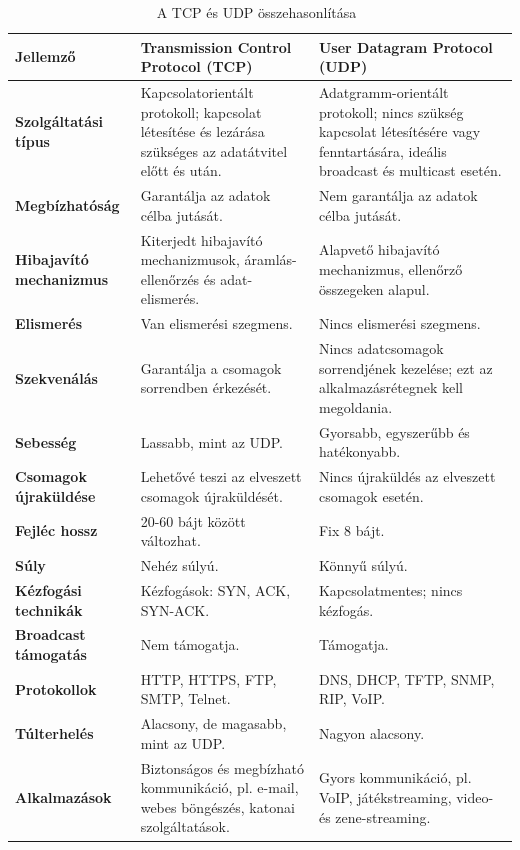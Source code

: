 \begin{table}[h!]
	\centering
	\begin{tabular}{|l|p{5cm}|p{5cm}|}
	\hline
	\textbf{Jellemző} & \textbf{Transmission Control Protocol (TCP)} & \textbf{User Datagram Protocol (UDP)} \\
	\hline
	\textbf{Szolgáltatási típus} & Kapcsolatorientált protokoll; kapcsolat létesítése és lezárása szükséges az adatátvitel előtt és után. & Adatgramm-orientált protokoll; nincs szükség kapcsolat létesítésére vagy fenntartására, ideális broadcast és multicast esetén. \\
	\hline
	\textbf{Megbízhatóság} & Garantálja az adatok célba jutását. & Nem garantálja az adatok célba jutását. \\
	\hline
	\textbf{Hibajavító mechanizmus} & Kiterjedt hibajavító mechanizmusok, áramlás-ellenőrzés és adat-elismerés. & Alapvető hibajavító mechanizmus, ellenőrző összegeken alapul. \\
	\hline
	\textbf{Elismerés} & Van elismerési szegmens. & Nincs elismerési szegmens. \\
	\hline
	\textbf{Szekvenálás} & Garantálja a csomagok sorrendben érkezését. & Nincs adatcsomagok sorrendjének kezelése; ezt az alkalmazásrétegnek kell megoldania. \\
	\hline
	\textbf{Sebesség} & Lassabb, mint az UDP. & Gyorsabb, egyszerűbb és hatékonyabb. \\
	\hline
	\textbf{Csomagok újraküldése} & Lehetővé teszi az elveszett csomagok újraküldését. & Nincs újraküldés az elveszett csomagok esetén. \\
	\hline
	\textbf{Fejléc hossz} & 20-60 bájt között változhat. & Fix 8 bájt. \\
	\hline
	\textbf{Súly} & Nehéz súlyú. & Könnyű súlyú. \\
	\hline
	\textbf{Kézfogási technikák} & Kézfogások: SYN, ACK, SYN-ACK. & Kapcsolatmentes; nincs kézfogás. \\
	\hline
	\textbf{Broadcast támogatás} & Nem támogatja. & Támogatja. \\
	\hline
	\textbf{Protokollok} & HTTP, HTTPS, FTP, SMTP, Telnet. & DNS, DHCP, TFTP, SNMP, RIP, VoIP. \\
	\hline
	\textbf{Túlterhelés} & Alacsony, de magasabb, mint az UDP. & Nagyon alacsony. \\
	\hline
	\textbf{Alkalmazások} & Biztonságos és megbízható kommunikáció, pl. e-mail, webes böngészés, katonai szolgáltatások. & Gyors kommunikáció, pl. VoIP, játékstreaming, video- és zene-streaming. \\
	\hline
	\end{tabular}
	\caption{A TCP és UDP összehasonlítása~\cite{UDP}}
	\label{tab:tcp_udp_comparison}
\end{table}

